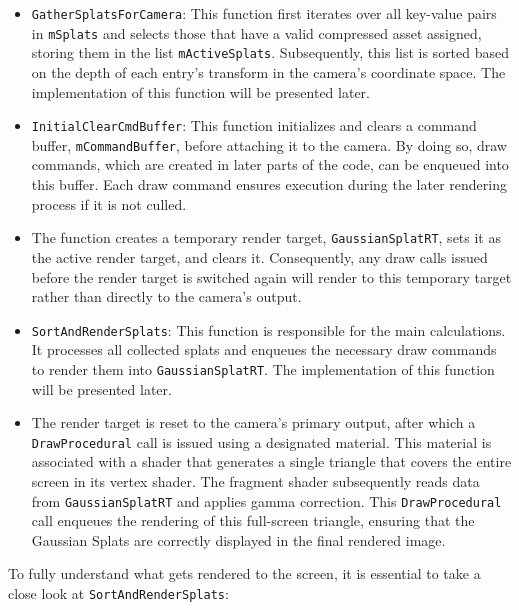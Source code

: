 \documentclass[12pt]{article}
\begin{document}
\begin{itemize}
	\item \texttt{GatherSplatsForCamera}: This function first iterates over all key-value pairs in \texttt{m\textunderscore Splats} and selects those that have a valid compressed asset assigned, storing them in the list \texttt{m\textunderscore ActiveSplats}. Subsequently, this list is sorted based on the depth of each entry’s transform in the camera’s coordinate space. The implementation of this function will be presented later.
	\item \texttt{InitialClearCmdBuffer}: This function initializes and clears a command buffer, \texttt{m\textunderscore CommandBuffer}, before attaching it to the camera. By doing so, draw commands, which are created in later parts of the code, can be enqueued into this buffer. Each draw command ensures execution during the later rendering process if it is not culled.
	\item The function creates a temporary render target, \texttt{GaussianSplatRT}, sets it as the active render target, and clears it. Consequently, any draw calls issued before the render target is switched again will render to this temporary target rather than directly to the camera’s output.
	\item \texttt{SortAndRenderSplats}: This function is responsible for the main calculations. It processes all collected splats and enqueues the necessary draw commands to render them into \texttt{GaussianSplatRT}. The implementation of this function will be presented later.
	\item  The render target is reset to the camera’s primary output, after which a \texttt{DrawProcedural} call is issued using a designated material. This material is associated with a shader that generates a  single triangle that covers the entire screen in its vertex shader. The fragment shader subsequently reads data from \texttt{GaussianSplatRT} and applies gamma correction. This \texttt{DrawProcedural} call enqueues the rendering of this full-screen triangle, ensuring that the Gaussian Splats are correctly displayed in the final rendered image.
\end{itemize}
To fully understand what gets rendered to the screen, it is essential to take a close look at \texttt{SortAndRenderSplats}:
\end{document}
